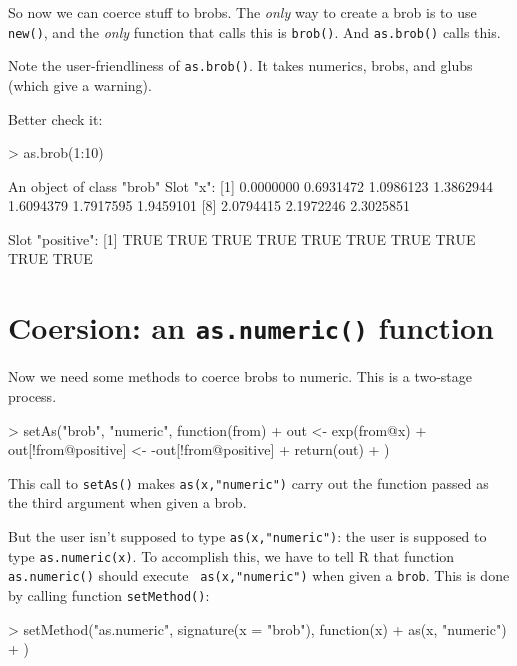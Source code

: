 \documentclass[a4paper]{article}
\begin{document}
So now we can coerce stuff to brobs.  The {\em only} way to create a
brob is to use {\tt new()}, and the {\em only} function that calls
this is {\tt brob()}.  And {\tt as.brob()} calls this.

Note the user-friendliness of {\tt as.brob()}.  It takes numerics,
brobs, and glubs (which give a warning).

Better check it:

\begin{Schunk}
\begin{Sinput}
> as.brob(1:10)
\end{Sinput}
\begin{Soutput}
An object of class "brob"
Slot "x":
 [1] 0.0000000 0.6931472 1.0986123 1.3862944 1.6094379 1.7917595 1.9459101
 [8] 2.0794415 2.1972246 2.3025851

Slot "positive":
 [1] TRUE TRUE TRUE TRUE TRUE TRUE TRUE TRUE TRUE TRUE
\end{Soutput}
\end{Schunk}

\section{Coersion: an {\tt as.numeric()} function}

Now we need some methods to coerce brobs to numeric.  This is a
two-stage process.


\begin{Schunk}
\begin{Sinput}
> setAs("brob", "numeric", function(from) {
+     out <- exp(from@x)
+     out[!from@positive] <- -out[!from@positive]
+     return(out)
+ })
\end{Sinput}
\end{Schunk}

This call to {\tt setAs()} makes {\tt as(x,"numeric")} carry out the
function passed as the third argument when given a brob. 

But the user isn't supposed to type {\tt as(x,"numeric")}: the user is
supposed to type {\tt as.numeric(x)}.  To accomplish this, we have to
tell R that function {\tt as.numeric()} should execute {\tt
as(x,"numeric")} when given a {\tt brob}.  This is done by calling
function {\tt setMethod()}:


\begin{Schunk}
\begin{Sinput}
> setMethod("as.numeric", signature(x = "brob"), function(x) {
+     as(x, "numeric")
+ })
\end{Sinput}
\end{Schunk}
\end{document}
